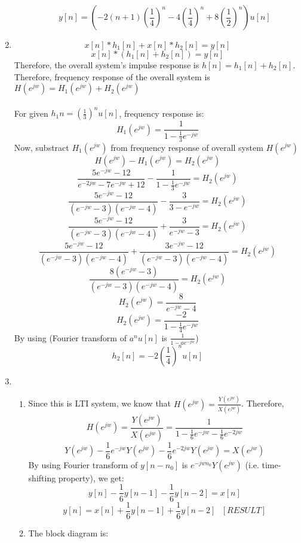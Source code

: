 \documentclass[10pt,a4paper, margin=1in]{article}
\begin{document}
\begin{enumerate}
\begin{enumerate}
     \[y[n] = \left(-2(n+1)(\frac{1}{4})^n -4(\frac{1}{4})^n +8(\frac{1}{2})^n\right)u[n]  \]
    
    \end{enumerate}

\item %
	\[ x[n]*h_1[n] + x[n]*h_2[n] = y[n] \]
	\[ x[n]*(h_1[n] + h_2[n]) = y[n] \]
	Therefore, the overall system's impulse response is $h[n] = h_1[n] + h_2[n]$. \\
	Therefore, frequency response of the overall system is $H(e^{jw}) = H_1(e^{jw}) + H_2(e^{jw})$
	\\
	\\
	For given $h_1n = (\frac{1}{3})^nu[n]$, frequency response is:
	\[ H_1(e^{jw}) = \frac{1}{1-\frac{1}{3}e^{-jw}} \]
	Now, substract $H_1(e^{jw})$ from frequency response of overall system $H(e^{jw})$
	\[ H(e^{jw}) -H_1(e^{jw}) = H_2(e^{jw}) \]
	\[ \frac{5e^{-jw}-12}{e^{-2jw} -7e^{-jw}+12} - \frac{1}{1-\frac{1}{3}e^{-jw}} = H_2(e^{jw}) \]
	\[ \frac{5e^{-jw}-12}{(e^{-jw}-3)(e^{-jw}-4)} - \frac{3}{3-e^{-jw}} = H_2(e^{jw}) \]
	\[ \frac{5e^{-jw}-12}{(e^{-jw}-3)(e^{-jw}-4)} + \frac{3}{e^{-jw}-3} = H_2(e^{jw}) \]
	\[ \frac{5e^{-jw}-12}{(e^{-jw}-3)(e^{-jw}-4)} + \frac{3e^{-jw} -12}{(e^{-jw}-3)(e^{-jw}-4)} = H_2(e^{jw}) \]
	\[ \frac{8(e^{-jw}-3)}{(e^{-jw}-3)(e^{-jw}-4)} = H_2(e^{jw}) \]
	\[ H_2(e^{jw}) = \frac{8}{e^{-jw}-4}\]
	\[ H_2(e^{jw}) = \frac{-2}{1- \frac{1}{4}e^{-jw}}\]
	 By using (Fourier transform of $a^nu[n]$ is $\frac{1}{1-ae^{-jw}}$)
	 \[ h_2[n] = -2(\frac{1}{4})^nu[n] \]

\item %
    \begin{enumerate}
    \item %
    Since this is LTI system, we know that $H(e^{jw}) = \frac{Y(e^{jw})}{X(e^{jw})}$. Therefore,
    \[ H(e^{jw}) = \frac{Y(e^{jw})}{X(e^{jw})} = \frac{1}{1 - \frac{1}{6}e^{-jw} - \frac{1}{6}e^{-2jw}} \]
    \[ Y(e^{jw}) - \frac{1}{6}e^{-jw}Y(e^{jw}) - \frac{1}{6}e^{-2jw}Y(e^{jw}) = X(e^{jw}) \]
    By using Fourier transform of $y[n-n_0]$ is $e^{-jwn_0}Y(e^{jw})$ (i.e. time-shifting property), we get:
    \[ y[n] - \frac{1}{6}y[n-1] - \frac{1}{6}y[n-2] = x[n] \]
    \[ y[n] = x[n] + \frac{1}{6}y[n-1] + \frac{1}{6}y[n-2] \ \ \ [RESULT] \]
    \item %
    The block diagram is:
    
	\newcommand{\suma}{\Large$+$}
	\newcommand{\delay}{$D$}
	

\end{enumerate}
\end{enumerate}
\end{document}
